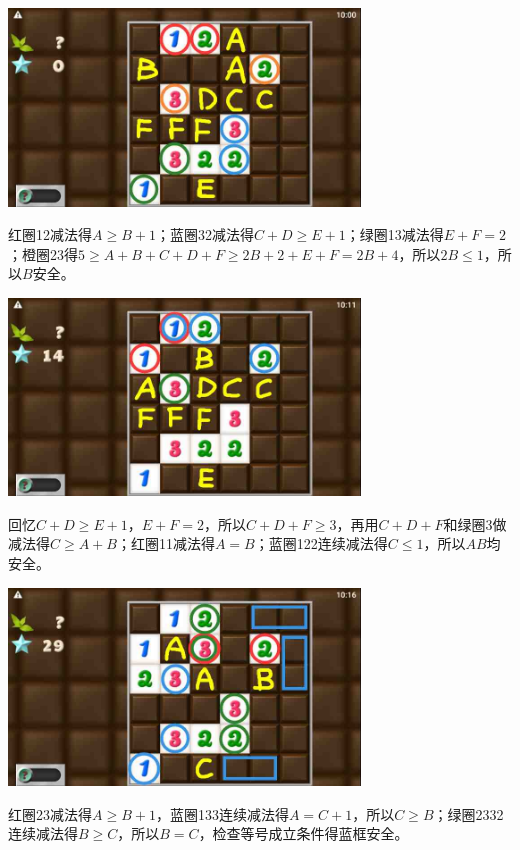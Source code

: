 \subsection{} %
\begin{center}
    \includegraphics[width=0.7\textwidth]{puzzlelow/237-1.jpg}
\end{center}
红圈12减法得$A\ge B+1$；蓝圈32减法得$C+D\ge E+1$；绿圈13减法得$E+F=2$；橙圈23得$5\ge A+B+C+D+F\ge 2B+2+E+F=2B+4$，所以$2B\le 1$，所以$B$安全。
\begin{center}
    \includegraphics[width=0.7\textwidth]{puzzlelow/237-2.jpg}
\end{center}
回忆$C+D\ge E+1$，$E+F=2$，所以$C+D+F\ge 3$，再用$C+D+F$和绿圈3做减法得$C\ge A+B$；红圈11减法得$A=B$；蓝圈122连续减法得$C\le 1$，所以$AB$均安全。
\begin{center}
    \includegraphics[width=0.7\textwidth]{puzzlelow/237-3.jpg}
\end{center}
红圈23减法得$A\ge B+1$，蓝圈133连续减法得$A=C+1$，所以$C\ge B$；绿圈2332连续减法得$B\ge C$，所以$B=C$，检查等号成立条件得蓝框安全。
